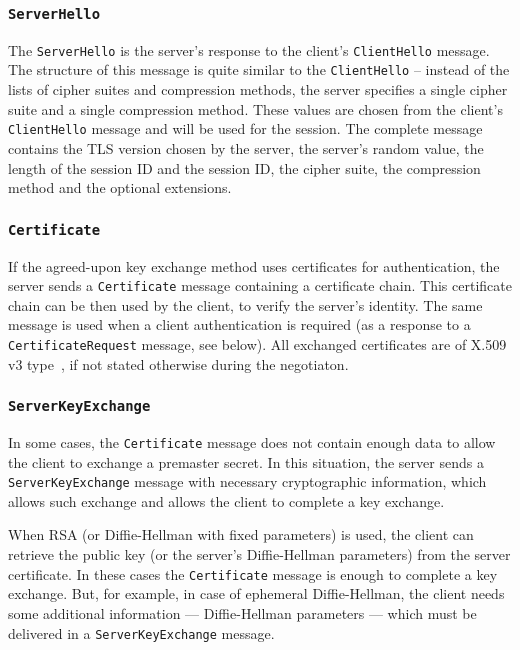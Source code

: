 \subsubsection{\texttt{ServerHello}}
    The \texttt{ServerHello} is the server's response to the client's
    \texttt{ClientHello} message. The structure of this message is quite similar
    to the \texttt{ClientHello} -- instead of the lists of cipher suites and
    compression methods, the server specifies a single cipher suite and a single
    compression method. These values are chosen from the client's \texttt{ClientHello}
    message and will be used for the session. The complete message contains
    the TLS version chosen by the server, the server's random value, the length
    of the session ID and the session ID, the cipher suite, the compression
    method and the optional extensions.

\subsubsection{\texttt{Certificate}}
    If the agreed-upon key exchange method uses certificates for authentication,
    the server sends a \texttt{Certificate} message containing a
    certificate chain. This certificate chain can be then used by the client,
    to verify the server's identity. The same message is used when a client
    authentication is required (as a response to a \texttt{CertificateRequest}
    message, see below). All exchanged certificates are of X.509 v3
    type~\cite{rfc5280}, if not stated otherwise during the negotiaton.

\subsubsection{\texttt{ServerKeyExchange}}
    In some cases, the \texttt{Certificate} message does not contain enough data to
    allow the client to exchange a premaster secret. In this situation, the
    server sends a \texttt{ServerKeyExchange} message with necessary cryptographic
    information, which allows such exchange and allows the client to complete
    a key exchange.

    When RSA (or Diffie-Hellman with fixed parameters) is used, the client can retrieve
    the public key (or the server's Diffie-Hellman parameters) from the server certificate.
    In these cases the \texttt{Certificate} message is enough to complete
    a key exchange. But, for example, in case of ephemeral Diffie-Hellman, the client
    needs some additional information --- Diffie-Hellman parameters --- which
    must be delivered in a \texttt{ServerKeyExchange} message.


